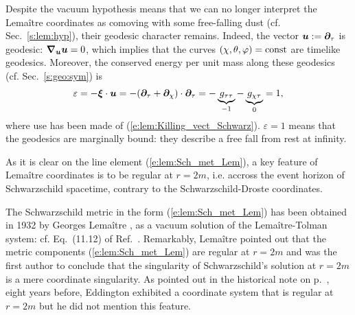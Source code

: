 Despite the vacuum hypothesis means that we can no longer interpret the
Lemaître coordinates as comoving with some free-falling dust (cf. Sec.~\ref{s:lem:hyp}),
their geodesic character remains. Indeed, the vector $\bm{u} := \bm{\partial}_\tau$ is geodesic:
$\bm{\nabla}_{\bm{u}}\bm{u} = 0$, which implies that the curves $(\chi,\theta,\varphi)=\mathrm{const}$
are timelike geodesics. Moreover, the conserved energy per unit mass along these geodesics
(cf. Sec.~\ref{s:geo:sym}) is
\[
     \varepsilon = - \bm{\xi}\cdot\bm{u} = - (\bm{\partial}_\tau + \bm{\partial}_\chi)\cdot \bm{\partial}_\tau
        = - \underbrace{g_{\tau\tau}}_{-1} - \underbrace{g_{\chi\tau}}_{0} = 1 ,
\]
where use has been made of (\ref{e:lem:Killing_vect_Schwarz}).
$\varepsilon=1$ means
that the geodesics are marginally bound: they
describe a free fall from rest at infinity.

As it is clear on the line element (\ref{e:lem:Sch_met_Lem}),
a key feature of Lemaître coordinates is to be regular at $r=2m$, i.e.
accross the event horizon of Schwarzschild spacetime, contrary to the
Schwarzschild-Droste coordinates.

\begin{hist}
The Schwarzschild metric in the form (\ref{e:lem:Sch_met_Lem}) has
been obtained in 1932 by Georges Lemaître \cite{Lemai32},
as a vacuum solution of the Lemaître-Tolman system: cf. Eq.~(11.12) of Ref.~\cite{Lemai32}.
Remarkably, Lemaître pointed out that the metric components (\ref{e:lem:Sch_met_Lem}) are
regular at $r=2m$ and was the first author to conclude that the singularity of
Schwarzschild's solution at $r=2m$ is a mere coordinate singularity.
As pointed out in the historical note on p.~\pageref{n:sch:Eddington_coord}, eight years before,
Eddington exhibited a coordinate system that is regular at $r=2m$ \cite{Eddin1924} but he
did not mention this feature.
\end{hist}

